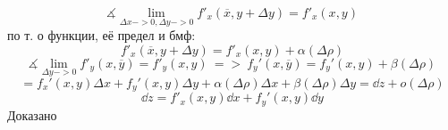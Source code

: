\documentclass{article}
\begin{document}
\begin{equation*}
    \measuredangle  \lim_{\Delta x -> 0, \Delta y -> 0}f'_x(\overline{x}, y+\Delta y) = f'_x(x, y)
\end{equation*}
по т. о функции, её предел и бмф:
\begin{equation*}
    f'_x(\overline{x}, y+\Delta y) = f'_x(x, y)+\alpha(\Delta \rho)
\end{equation*}
\begin{equation*}
    \measuredangle  \lim_{\Delta y -> 0}f'_y(x,\overline{y}) = f'_y(x, y)\ => \ f_y'(x, \overline{y}) = f_y'(x, y)+ \beta(\Delta \rho)
\end{equation*}
\begin{equation*}
    = f_x'(x, y)\Delta x+ f_y'(x,y)\Delta y +\alpha (\Delta \rho)\Delta x +\beta(\Delta \rho)\Delta y = \dd z+ o(\Delta \rho)
\end{equation*}
\begin{equation*}
    \dd z = f'_x(x,y)\dd x + f_y'(x,y)\dd y
\end{equation*}
Доказано\\
\end{document}
